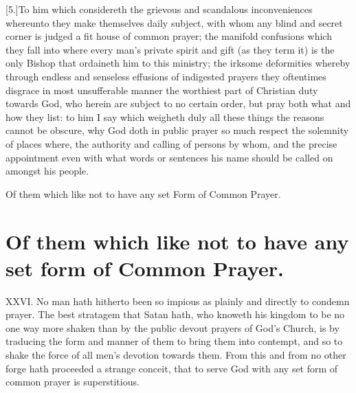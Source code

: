 [5.]To him which considereth the grievous and scandalous inconveniences whereunto they make themselves daily subject, with whom any blind and secret corner is judged a fit house of common prayer; the manifold confusions which they fall into where every man’s private spirit and gift (as they term it) is the only Bishop that ordaineth him to this ministry; the irksome deformities whereby through endless and senseless effusions of indigested prayers they oftentimes disgrace in most unsufferable manner the worthiest part of Christian duty towards God, who herein are subject to no certain order, but pray both what and how they list: to him I say which weigheth duly all these things the reasons cannot be obscure, why God doth in public prayer so much respect the solemnity of places where, the authority and calling of persons by whom, and the precise appointment even with what words or sentences his name should be called on amongst his people.


Of them which like not to have any set Form of Common Prayer.
\section*{Of them which like not to have any set form of Common Prayer.}
XXVI. No man hath hitherto been so impious as plainly and directly to condemn prayer. The best stratagem that Satan hath, who knoweth his kingdom to be no one way more  shaken than by the public devout prayers of God’s Church, is by traducing the form and manner of them to bring them into contempt, and so to shake the force of all men’s devotion towards them.
 From this and from no other forge hath proceeded a strange conceit, that to serve God with any set form of common prayer is superstitious.

